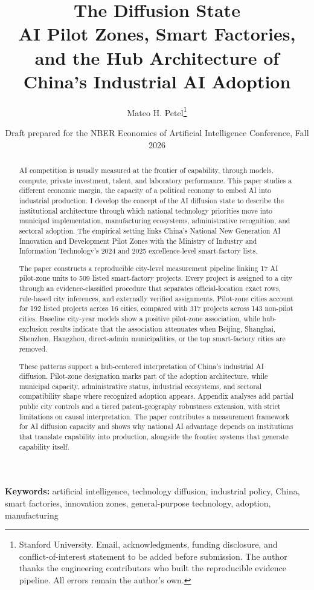 \documentclass[12pt]{article}
\title{The Diffusion State\\AI Pilot Zones, Smart Factories, and the Hub Architecture of China's Industrial AI Adoption}
\author{Mateo H. Petel\thanks{Stanford University. Email, acknowledgments, funding disclosure, and conflict-of-interest statement to be added before submission. The author thanks the engineering contributors who built the reproducible evidence pipeline. All errors remain the author's own.}}
\date{Draft prepared for the NBER Economics of Artificial Intelligence Conference, Fall 2026}
\begin{document}
\maketitle

\begin{abstract}
AI competition is usually measured at the frontier of capability, through models, compute, private investment, talent, and laboratory performance. This paper studies a different economic margin, the capacity of a political economy to embed AI into industrial production. I develop the concept of the AI diffusion state to describe the institutional architecture through which national technology priorities move into municipal implementation, manufacturing ecosystems, administrative recognition, and sectoral adoption. The empirical setting links China's National New Generation AI Innovation and Development Pilot Zones with the Ministry of Industry and Information Technology's 2024 and 2025 excellence-level smart-factory lists.

The paper constructs a reproducible city-level measurement pipeline linking 17 AI pilot-zone units to 509 listed smart-factory projects. Every project is assigned to a city through an evidence-classified procedure that separates official-location exact rows, rule-based city inferences, and externally verified assignments. Pilot-zone cities account for 192 listed projects across 16 cities, compared with 317 projects across 143 non-pilot cities. Baseline city-year models show a positive pilot-zone association, while hub-exclusion results indicate that the association attenuates when Beijing, Shanghai, Shenzhen, Hangzhou, direct-admin municipalities, or the top smart-factory cities are removed.

These patterns support a hub-centered interpretation of China's industrial AI diffusion. Pilot-zone designation marks part of the adoption architecture, while municipal capacity, administrative status, industrial ecosystems, and sectoral compatibility shape where recognized adoption appears. Appendix analyses add partial public city controls and a tiered patent-geography robustness extension, with strict limitations on causal interpretation. The paper contributes a measurement framework for AI diffusion capacity and shows why national AI advantage depends on institutions that translate capability into production, alongside the frontier systems that generate capability itself.
\end{abstract}

\noindent \textbf{Keywords:} artificial intelligence, technology diffusion, industrial policy, China, smart factories, innovation zones, general-purpose technology, adoption, manufacturing
\end{document}

